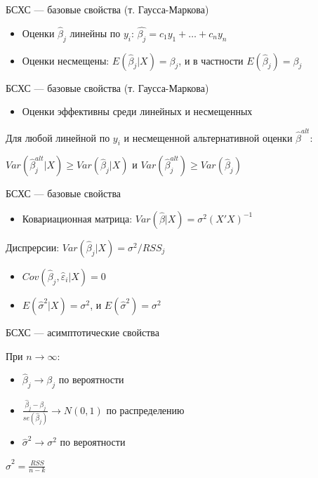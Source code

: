 \documentclass[ignorenonframetext,]{beamer}
\begin{document}
\begin{frame}{БСХС --- базовые свойства (т. Гаусса-Маркова)}

\begin{itemize}
\item
  Оценки $\hat{\beta}_j$ линейны по $y_i$:
  $\hat{\beta_j}=c_1 y_1 + \ldots + c_n y_n$
\item
  Оценки несмещены: $E(\hat{\beta}_j |X )=\beta_j$, и в частности
  $E(\hat{\beta}_j)=\beta_j$
\end{itemize}

\end{frame}

\begin{frame}{БСХС --- базовые свойства (т. Гаусса-Маркова)}

\begin{itemize}
\itemsep1pt\parskip0pt
\item
  Оценки эффективны среди линейных и несмещенных
\end{itemize}

Для любой линейной по $y_i$ и несмещенной альтернативной оценки
$\hat{\beta}^{alt}$:

$Var(\hat{\beta}_j^{alt} | X)\geq Var(\hat{\beta}_j | X)$ и
$Var(\hat{\beta}_j^{alt} )\geq Var(\hat{\beta}_j )$

\end{frame}

\begin{frame}{БСХС --- базовые свойства}

\begin{itemize}
\itemsep1pt\parskip0pt
\item
  Ковариационная матрица: $Var(\hat{\beta} | X )=\sigma^2 (X'X)^{-1}$
\end{itemize}

Диспрерсии: $Var(\hat{\beta}_j| X)=\sigma^2/RSS_j$

\begin{itemize}
\itemsep1pt\parskip0pt
\item
  $Cov(\hat{\beta}_j,\hat{\varepsilon}_i | X)=0$
\item
  $E(\hat{\sigma}^2 |X ) = \sigma^2$, и $E(\hat{\sigma}^2 ) = \sigma^2$
\end{itemize}

\end{frame}

\begin{frame}{БСХС --- асимптотические свойства}

При $n\to \infty$:

\begin{itemize}
\itemsep1pt\parskip0pt
\item
  $\hat{\beta}_j \to \beta_j$ по вероятности
\item
  $\frac{\hat{\beta}_j-\beta_j}{se(\hat{\beta}_j)} \to N(0,1)$ по
  распределению
\item
  $\hat{\sigma}^2 \to \sigma^2$ по вероятности
\end{itemize}

$\hat{\sigma}^2=\frac{RSS}{n-k}$

\end{frame}
\end{document}
